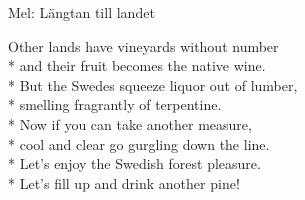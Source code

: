 \begin{SongText}
    \begin{SongInfo}
        Mel: Längtan till landet
    \end{SongInfo}
    \begin{SongVerse}
        Other lands have vineyards without number\\*%
        and their fruit becomes the native wine.\\*%
        But the Swedes squeeze liquor out of lumber,\\*%
        smelling fragrantly of terpentine.\\*%
        Now if you can take another measure,\\*%
        cool and clear go gurgling down the line.\\*%
        Let's enjoy the Swedish forest pleasure.\\*%
        Let's fill up and drink another pine!
    \end{SongVerse}
\end{SongText}
